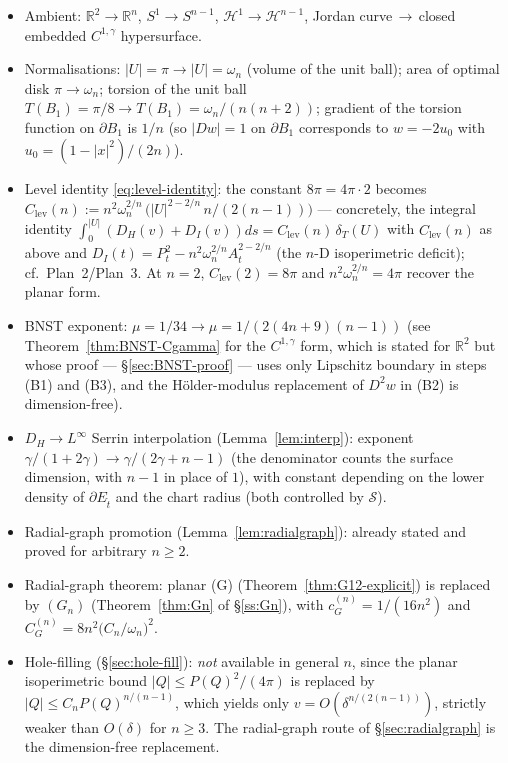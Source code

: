 \documentclass[11pt]{amsart}
\newcommand{\R}{\mathbb R}
\newcommand{\Et}{E_{\hat t}}
\newcommand{\dT}{\delta_T}
\newcommand{\HH}{\mathcal H}
\newcommand{\Sclass}{\mathcal S}
\begin{document}
\begin{itemize}[leftmargin=2em]
\item Ambient: $\R^2\to\R^n$, $S^1\to S^{n-1}$,
$\HH^1\to\HH^{n-1}$, Jordan curve\,$\to$\,closed embedded
$C^{1,\gamma}$ hypersurface.
\item Normalisations: $|U|=\pi\to|U|=\omega_n$ (volume of the unit
ball); area of optimal disk $\pi\to\omega_n$; torsion of the unit
ball $T(B_1)=\pi/8\to T(B_1)=\omega_n/(n(n+2))$; gradient of the
torsion function on $\partial B_1$ is $1/n$ (so $|Dw|=1$ on
$\partial B_1$ corresponds to $w=-2 u_0$ with $u_0=(1-|x|^2)/(2n)$).
\item Level identity \eqref{eq:level-identity}: the constant
$8\pi=4\pi\cdot 2$ becomes
$C_{\mathrm{lev}}(n):=n^{2}\omega_n^{2/n}\,\bigl(|U|^{2-2/n}\,
n/(2(n-1))\bigr)$ — concretely, the integral identity
$\int_0^{|U|}(D_H(v)+D_I(v))ds=C_{\mathrm{lev}}(n)\,\dT(U)$ with
$C_{\mathrm{lev}}(n)$ as above and $D_I(t)=P_t^2-n^{2}
\omega_n^{2/n} A_t^{2-2/n}$ (the $n$-D isoperimetric deficit);
cf.\ Plan~2/Plan~3.  At $n=2$, $C_{\mathrm{lev}}(2)=8\pi$ and
$n^{2}\omega_n^{2/n}=4\pi$ recover the planar form.
\item BNST exponent: $\mu=1/34\to\mu=1/(2(4n+9)(n-1))$ (see
Theorem~\ref{thm:BNST-Cgamma} for the $C^{1,\gamma}$ form, which is
stated for $\R^2$ but whose proof — \S\ref{sec:BNST-proof} — uses
only Lipschitz boundary in steps (B1) and (B3), and the
Hölder-modulus replacement of $D^2 w$ in (B2) is dimension-free).
\item $D_H\to L^\infty$ Serrin interpolation (Lemma~\ref{lem:interp}):
exponent $\gamma/(1+2\gamma)\to\gamma/(2\gamma+n-1)$ (the
denominator counts the surface dimension, with $n-1$ in place of
$1$), with constant depending on the lower density of $\partial\Et$
and the chart radius (both controlled by $\Sclass$).
\item Radial-graph promotion (Lemma~\ref{lem:radialgraph}): already
stated and proved for arbitrary $n\ge 2$.
\item Radial-graph theorem: planar (G) (Theorem~\ref{thm:G12-explicit})
is replaced by $(G_n)$ (Theorem~\ref{thm:Gn} of \S\ref{ss:Gn}),
with $c_G^{(n)}=1/(16 n^{2})$ and $C_G^{(n)}=8 n^{2}\bigl(C_n/
\omega_n\bigr)^{2}$.
\item Hole-filling (\S\ref{sec:hole-fill}): \emph{not} available in
general $n$, since the planar isoperimetric bound $|Q|\le P(Q)^{2}/
(4\pi)$ is replaced by $|Q|\le C_n P(Q)^{n/(n-1)}$, which yields
only $v=O(\delta^{n/(2(n-1))})$, strictly weaker than $O(\delta)$
for $n\ge 3$.  The radial-graph route of \S\ref{sec:radialgraph}
is the dimension-free replacement.
\end{itemize}
\end{document}
